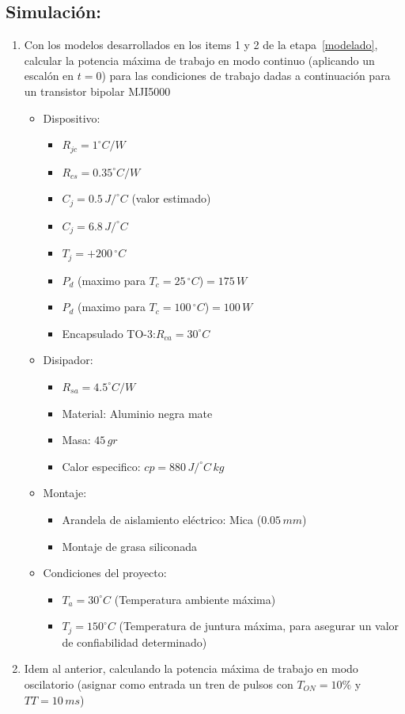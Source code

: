 \documentclass[10pt]{article}
\begin{document}
\subsection{Simulación:}
\begin{enumerate}
   \item Con los modelos desarrollados en los items 1 y 2 de la etapa~\ref{modelado}, calcular la potencia máxima de trabajo en modo continuo (aplicando un escalón en $t=0$) para las condiciones de trabajo dadas a continuación para un
      transistor bipolar MJI5000
      \begin{itemize}
         \item Dispositivo:
            \begin{itemize}
               \item $R_{jc}=1^{\circ}C/W$
               \item $R_{cs}=0.35^{\circ}C/W$
               \item $C_{j}=0.5\,J/^{\circ}C$ (valor estimado)
               \item $C_{j}=6.8\,J/^{\circ}C$
               \item $T_{j}=+200\,^{\circ}C$
               \item $P_{d}$ (maximo para $T_{c}=25\,^{\circ}C$)$=175\,W$
               \item $P_{d}$ (maximo para $T_{c}=100\,^{\circ}C$)$=100\,W$
               \item Encapsulado TO-3:$R_{ca}=30^{\circ}C$
            \end{itemize}
         \item Disipador:
            \begin{itemize}
               \item $R_{sa}=4.5^{\circ}C/W$
               \item Material: Aluminio negra mate
               \item Masa: $45\,gr$
               \item Calor especifico: $cp=880\,J/^{\circ}C\,kg$
            \end{itemize}
         \item Montaje:
            \begin{itemize}
               \item Arandela de aislamiento eléctrico: Mica ($0.05\,mm$)
               \item Montaje de grasa siliconada
            \end{itemize}
         \item Condiciones del proyecto:
            \begin{itemize}
               \item $T_{a}=30^{\circ}C$ (Temperatura ambiente máxima)
               \item $T_{j}=150^{\circ}C$ (Temperatura de juntura máxima, para asegurar un valor de confiabilidad determinado)
            \end{itemize}
      \end{itemize}
   \item Idem al anterior, calculando la potencia máxima de trabajo en modo oscilatorio (asignar como entrada un tren de pulsos con $T_{ON}=10\%$ y $TT=10\,ms$)
\end{enumerate}
\end{document}
